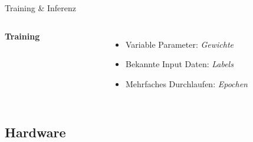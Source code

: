 \begin{frame}{Training \& Inferenz}
    \begin{columns}[T]
        \textbf{Training}
        \begin{figure}
            \centering
            \def\svgwidth{0.8\columnwidth}
            
        \end{figure}
        \begin{itemize}
            \item Variable Parameter: \textit{Gewichte}
            \item Bekannte Input Daten: \textit{Labels}
            \item Mehrfaches Durchlaufen: \textit{Epochen}
        \end{itemize}
    \end{columns}
\end{frame}



\subsection[\thesection .\thesubsection \ 
Hardware]{Hardware}\label{subsec:hw}

